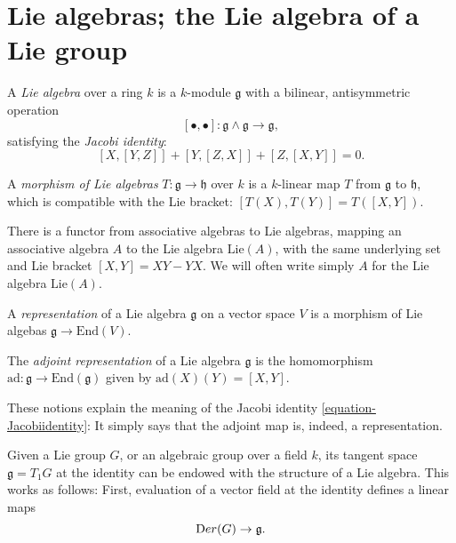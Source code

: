 \section{Lie algebras; the Lie algebra of a Lie group}
\label{section-Liealgebras}

\begin{definition}
\label{definition-Liealgebra}
A {\it Lie algebra} over a ring $k$ is a $k$-module $\mathfrak g$ with a bilinear, antisymmetric operation 
$$[\bullet,\bullet]: \mathfrak g \wedge \mathfrak g \to \mathfrak g,$$ 
satisfying the {\it Jacobi identity}:
\begin{equation} 
\label{equation-Jacobiidentity}
[X,[Y,Z]] + [Y,[Z,X]] + [Z,[X,Y]] = 0. 
\end{equation}

A {\it morphism of Lie algebras} $T:\mathfrak g \to \mathfrak h$ over $k$ is a $k$-linear map $T$ from $\mathfrak g$ to $\mathfrak h$, which is compatible with the Lie bracket: $[T(X), T(Y)] = T([X,Y])$.
\end{definition}

There is a functor from associative algebras to Lie algebras, mapping an associative algebra $A$ to the Lie algebra $\text{Lie}(A)$, with the same underlying set and Lie bracket $[X,Y]=XY-YX$. We will often write simply $A$ for the Lie algebra $\text{Lie}(A)$.

\begin{definition}
 \label{definition-representation-Liealgebra}
A {\it representation} of a Lie algebra $\mathfrak g$ on a vector space $V$ is a morphism of Lie algebas $\mathfrak g \to \text{End}(V)$. 
\end{definition}

\begin{definition}
 \label{definition-adjoint-representation-Liealgebra}
The {\it adjoint representation} of a Lie algebra $\mathfrak g$ is the homomorphism $\text{ad}:\mathfrak g\to \text{End}(\mathfrak g)$ given by $\text{ad}(X)(Y)=[X,Y]$.
\end{definition}


\begin{remark}
\label{remark-Jacobiidentity}
These notions explain the meaning of the Jacobi identity \eqref{equation-Jacobiidentity}: It simply says that the adjoint map is, indeed, a representation.
\end{remark}





Given a Lie group $G$, or an algebraic group over a field $k$, its tangent space $\mathfrak g = T_1 G$ at the identity can be endowed with the structure of a Lie algebra. This works as follows: First, evaluation of a vector field at the identity defines a linear maps
$$ {\text Der}(G) \to \mathfrak g.$$

